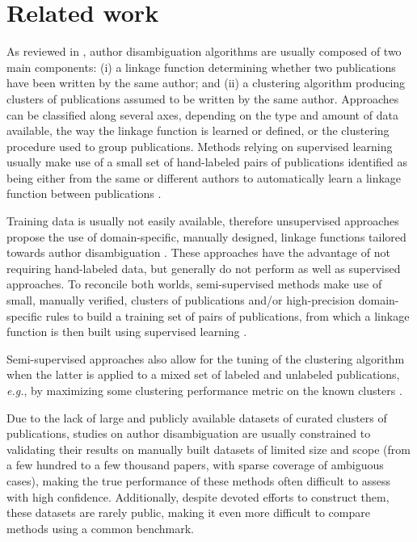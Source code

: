 \documentclass{article}
\newcommand{\eg}{\emph{e.g.}\xspace}
\begin{document}

\section{Related work}
\label{related-works}

As reviewed in \citep{smalheiser2009author,ferreira2012brief,levin2012citation}, author
disambiguation algorithms are usually composed of two main components: (i) a
linkage function determining whether two publications have been written by the
same author; and (ii) a clustering algorithm producing clusters of publications
assumed to be written by the same author.
Approaches can be classified along several axes, depending on the type and
amount of data available, the way the linkage function is learned or defined, or the
clustering procedure used to group publications.
Methods relying on supervised learning usually make use of a small set of hand-labeled pairs
of publications identified as being either from the same or different authors to automatically learn a linkage
function between publications \citep{han2004two,huang2006efficient, culotta2007author,treeratpituk2009disambiguating,tran2014author}.

Training data is usually not easily available, therefore unsupervised approaches propose
the use of domain-specific, manually designed, linkage functions tailored towards author
disambiguation \citep{malin2005unsupervised,mcrae2006also,song2007efficient,
soler2007separating, kang2009co,fan2011graph,schulz2014exploiting}.
These approaches have the advantage of not requiring hand-labeled data, but generally do
not perform as well as supervised approaches.
To reconcile both worlds, semi-supervised methods make use of small, manually verified, clusters of
publications and/or high-precision domain-specific rules to build a training
set of pairs of publications, from which a linkage function is then built using supervised learning
\citep{ferreira2010effective,torvik2009author,levin2012citation}.

Semi-supervised approaches also allow for the tuning of the
clustering algorithm when the latter is applied to a mixed set of labeled
and unlabeled publications, \eg, by maximizing some clustering performance
metric on the known clusters \citep{levin2012citation}.

Due to the lack of large and publicly available datasets of curated
clusters of publications, studies on author disambiguation are usually
constrained to validating their results on manually built datasets of limited
size and scope (from a few hundred to a few thousand papers, with sparse
coverage of ambiguous cases), making the true performance of these methods
often difficult to assess with high confidence.
Additionally, despite devoted efforts to construct them, these datasets are rarely public,
making it even more difficult to compare methods using a common benchmark.
\end{document}

